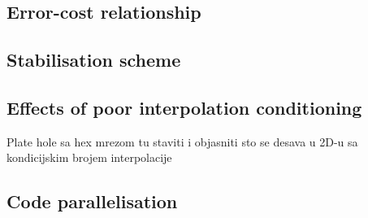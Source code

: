 \documentclass[sn-mathphys,Numbered]{sn-jnl}%
\newcommand{\bb}{\boldsymbol}
\begin{document}
\subsection{Error-cost relationship}

\subsection{Stabilisation scheme}

\subsection{Effects of poor interpolation conditioning}

Plate hole sa hex mrezom tu staviti i objasniti sto se desava u 2D-u sa kondicijskim brojem interpolacije

\subsection{Code parallelisation}



\end{document}
